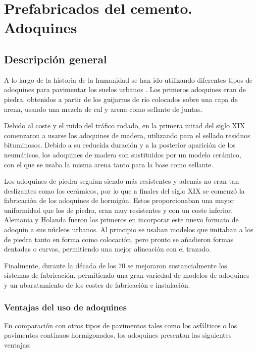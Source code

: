 \chapter{Prefabricados del cemento. Adoquines}
\section{Descripción general}
A lo largo de la historia de la humanidad se han ido utilizando diferentes tipos de adoquines para pavimentar los suelos urbanos \cite{euroadoquin}. Los primeros adoquines eran de piedra, obtenidos a partir de los guijarros de río colocados sobre una capa de arena, usando una mezcla de cal y arena como sellante de juntas.

Debido al coste y el ruido del tráfico rodado, en la primera mitad del siglo XIX comenzaron a usarse los adoquines de madera, utilizando para el sellado residuos bituminosos. Debido a su reducida duración y a la posterior aparición de los neumáticos, los adoquines de madera son sustituidos por un modelo cerámico, con el que se usaba la misma arena tanto para la base como sellante.

Los adoquines de piedra seguían siendo más resistentes y además no eran tan deslizantes como los cerámicos, por lo que a finales del siglo XIX se comenzó la fabricación de los adoquines de hormigón. Estos proporcionaban una mayor uniformidad que los de piedra, eran muy resistentes y con un coste inferior. Alemania y Holanda fueron los primeros en incorporar este nuevo formato de adoquín a sus núcleos urbanos. Al principio se usaban modelos que imitaban a los de piedra tanto en forma como colocación, pero pronto se añadieron formas dentadas o curvas, permitiendo una mejor alineación con el trazado.

Finalmente, durante la década de los 70 se mejoraron sustancialmente los sistemas de fabricación, permitiendo una gran variedad de modelos de adoquines y un abaratamiento de los costes de fabricación e instalación.

\subsection{Ventajas del uso de adoquines}

En comparación con otros tipos de pavimentos tales como los asfálticos o los pavimentos contínuos hormigonados, los adoquines presentan las siguientes ventajas:

